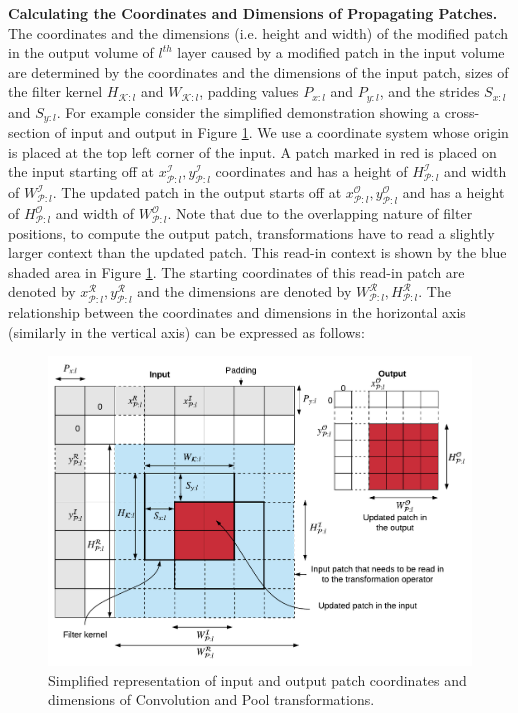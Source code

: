 \vspace{2mm}
\noindent \textbf{Calculating the Coordinates and Dimensions of Propagating Patches.} The coordinates and the dimensions (i.e. height and width) of the modified patch in the output volume of $l^{th}$ layer caused by a modified patch in the input volume are determined by the coordinates and the dimensions of the input patch, sizes of the filter kernel $H_{\mathcal{K}:l}$ and $W_{\mathcal{K}:l}$, padding values $P_{x:l}$ and $P_{y:l}$, and the strides $S_{x:l}$ and $S_{y:l}$.
For example consider the simplified demonstration showing a cross-section of input and output in Figure \ref{fig:dimensions}.
We use a coordinate system whose origin is placed at the top left corner of the input.
A patch marked in red is placed on the input starting off at $x^\mathcal{I}_{\mathcal{P}:l}, y^\mathcal{I}_{\mathcal{P}:l}$ coordinates and has a height of $H^\mathcal{I}_{\mathcal{P}:l}$ and width of $W^\mathcal{I}_{\mathcal{P}:l}$.
The updated patch in the output starts off at $x^\mathcal{O}_{\mathcal{P}:l}, y^\mathcal{O}_{\mathcal{P}:l}$ and has a height of $H^\mathcal{O}_{\mathcal{P}:l}$ and width of $W^\mathcal{O}_{\mathcal{P}:l}$.
Note that due to the overlapping nature of filter positions, to compute the output patch, transformations have to read a slightly larger context than the updated patch.
This read-in context is shown by the blue shaded area in Figure \ref{fig:dimensions}.
The starting coordinates of this read-in patch are denoted by $x^\mathcal{R}_{\mathcal{P}:l}, y^\mathcal{R}_{\mathcal{P}:l}$ and the dimensions are denoted by $W^\mathcal{R}_{\mathcal{P}:l}, H^\mathcal{R}_{\mathcal{P}:l}$.
The relationship between the coordinates and dimensions in the horizontal axis (similarly in the vertical axis) can be expressed as follows:

\begin{figure}[t]
\includegraphics[width=\columnwidth]{images/dimensions}
\caption{Simplified representation of input and output patch coordinates and dimensions of Convolution and Pool transformations.}
\label{fig:dimensions}
\end{figure}

